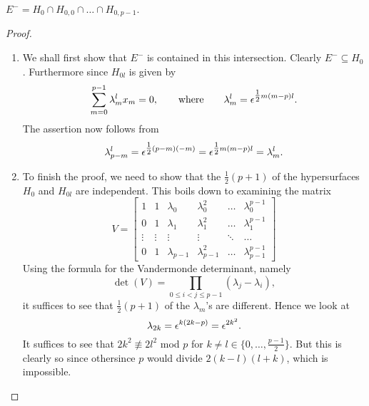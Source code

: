 \begin{lemma}\cite{Hulek_1983}
$E^{-} = H_{0} \cap H_{0,0} \cap \ldots \cap H_{0,p-1}$.
\end{lemma}
\begin{proof}
	\begin{enumerate}
		\item We shall first show that $E^{-}$ is contained in this intersection. Clearly $E^{-} \subseteq H_{0}$. Furthermore since $H_{0l}$ is given by
		\begin{equation*}
		\sum_{m=0}^{p-1}\lambda_{m}^{l}x_{m} = 0,\qquad \text{where}\qquad \lambda_{m}^{l} = \epsilon^{\tfrac{1}{2}m(m-p)l}.
		\end{equation*}
		The assertion now follows from
		\begin{equation*}
		\lambda_{p-m}^{l} = \epsilon^{\tfrac{1}{2}(p-m)(-m)} = \epsilon^{\tfrac{1}{2}m(m-p)l} = \lambda_{m}^{l}.
		\end{equation*}
		\item To finish the proof, we need to show that the $\tfrac{1}{2}(p+1)$ of the hypersurfaces $H_{0}$ and $H_{0l}$ are independent. This boils down to examining the matrix
		\begin{equation*}
		V = 
		\begin{bmatrix}
		1 & 1 & \lambda_{0} & \lambda_{0}^{2} & \ldots & \lambda_{0}^{p-1}\\
		0 & 1 & \lambda_{1} & \lambda_{1}^{2} & \ldots & \lambda_{1}^{p-1}\\
		\vdots & \vdots & \vdots & \vdots & \ddots & \ldots\\
		0 & 1 & \lambda_{p-1} & \lambda_{p-1}^{2} & \ldots & \lambda_{p-1}^{p-1}
		\end{bmatrix}
		\end{equation*}
		Using the formula for the Vandermonde determinant, namely
		\begin{equation*}
		\det(V) = \prod_{0\leq i < j \leq p-1}(\lambda_{j} - \lambda_{i}),
		\end{equation*}
		it suffices to see that $\tfrac{1}{2}(p+1)$ of the $\lambda_{m}$'s are different. Hence we look at
		\begin{equation*}
		\lambda_{2k} = \epsilon^{k(2k-p)} = \epsilon^{2k^{2}}.
		\end{equation*}
		It suffices to see that $2k^{2} \not\equiv 2l^{2}$ mod $p$ for $k\neq l \in \{0,\ldots, \tfrac{p-1}{2}\}$. But this is clearly so since othersince $p$ would divide $2(k-l)(l+k)$, which is impossible.
	\end{enumerate}
\end{proof}

